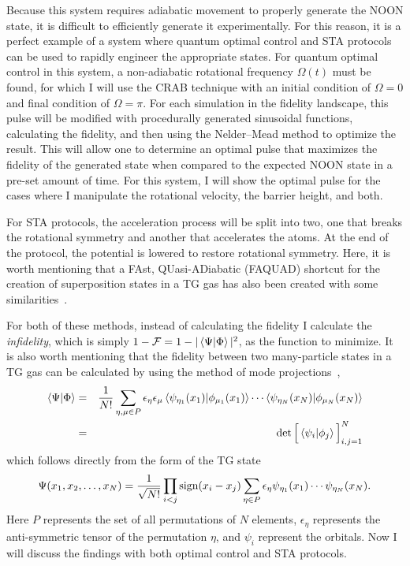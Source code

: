 Because this system requires adiabatic movement to properly generate the NOON state, it is difficult to efficiently generate it experimentally.
For this reason, it is a perfect example of a system where quantum optimal control and STA protocols can be used to rapidly engineer the appropriate states.
For quantum optimal control in this system, a non-adiabatic rotational frequency $\Omega(t)$ must be found, for which I will use the CRAB technique with an initial condition of $\Omega = 0$ and final condition of $\Omega = \pi$.
For each simulation in the fidelity landscape, this pulse will be modified with procedurally generated sinusoidal functions, calculating the fidelity, and then using the Nelder--Mead method to optimize the result.
This will allow one to determine an optimal pulse that maximizes the fidelity of the generated state when compared to the expected NOON state in a pre-set amount of time.
For this system, I will show the optimal pulse for the cases where I manipulate the rotational velocity, the barrier height, and both.

For STA protocols, the acceleration process will be split into two, one that breaks the rotational symmetry and another that accelerates the atoms.
At the end of the protocol, the potential is lowered to restore rotational symmetry.
Here, it is worth mentioning that a FAst, QUasi-ADiabatic (FAQUAD) shortcut for the creation of superposition states in a TG gas has also been created with some similarities~\cite{garaot2015}.

For both of these methods, instead of calculating the fidelity I calculate the \textit{infidelity}, which is simply $1-\mathcal{F} = 1-|\braket{\Psi|\Phi}|^2$, as the function to minimize.
It is also worth mentioning that the fidelity between two many-particle states in a TG gas can be calculated by using the method of mode projections~\cite{campo2011,lelas2011},
\begin{eqnarray}
\braket{\Psi | \Phi} &=& \frac1{N!} \sum_{\eta, \mu \in P} \epsilon_\eta \epsilon_\mu \braket{\psi_{\eta_1}(x_1) | \phi_{\mu_1}(x_1) } \cdots \braket{ \psi_{\eta_N}(x_N) | \phi_{\mu_N}(x_N) } \nonumber \\
\label{eq:fid}
&=&
\det \Big[ \braket{\psi_i | \phi_j }\Big]_{i,j=1}^N
\end{eqnarray}
which follows directly from the form of the TG state~\cite{girardeau1960}
\begin{equation}
\Psi(x_1,x_2,\ldots, x_N)= \frac1{\sqrt{N!}} \prod_{i<j}\textnormal{sign}(x_i-x_j) \sum_{\eta \in P} \epsilon_\eta \psi_{\eta_1}(x_1)\cdots\psi_{\eta_N}(x_N).
\label{eq:TG}
\end{equation}
Here $P$ represents the set of all permutations of $N$ elements, $\epsilon_\eta$ represents the anti-symmetric tensor of the permutation $\eta$, and $\psi_i$ represent the orbitals.
Now I will discuss the findings with both optimal control and STA protocols.


